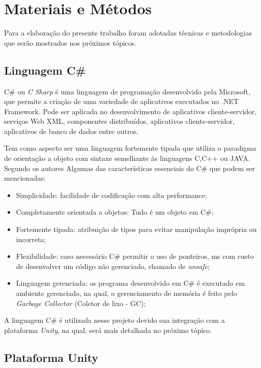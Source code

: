 
\chapter{Materiais e Métodos}

Para a elaboração do presente trabalho foram adotadas técnicas e metodologias que serão mostrados nos próximos tópicos.

\section{Linguagem C\#}

C\# ou \textit{C Sharp} é uma linguagem de programação desenvolvido pela Microsoft, que permite a criação de uma variedade de aplicativos executados no .NET Framework. Pode ser aplicada no desenvolvimento de aplicativos cliente-servidor, serviços Web XML, componentes distribuídos, aplicativos cliente-servidor, aplicativos de banco de dados entre outros.

Tem como aspecto ser uma linguagem fortemente tipada que utiliza o paradigma de orientação a objeto com sintaxe semelhante às linguagens C,C++ ou JAVA. Segundo os autores  Algumas das características essenciais do C\# que podem ser mencionadas:

\begin{itemize}
	\item Simplicidade: facilidade de codificação com alta performance;
	\item Completamente orientada a objetos: Tudo é um objeto em C\#;
	\item Fortemente tipada: atribuição de tipos para evitar manipulação imprópria ou incorreta;
	\item Flexibilidade: caso necessário C\# permitir o uso de ponteiros, ms com custo de desenvolver um código não gerenciado, chamado de \textit{unsafe};
	\item Linguagem  gerenciada: os programa desenvolvido em C\# é executado em ambiente gerenciado, na qual, o gerenciamento de memória é feito pelo \textit{Garbage Collector} (Coletor de lixo - GC);
\end{itemize}

A linguagem C\# é utilizada nesse projeto devido sua integração com a plataforma \textit{Unity}, na qual, será mais detalhada no próximo tópico.

\section{Plataforma Unity}

